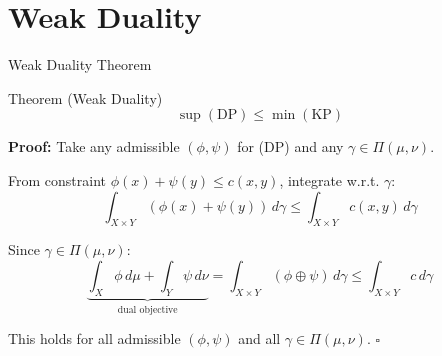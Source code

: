 \documentclass[aspectratio=169]{beamer}
\begin{document}
\section{Weak Duality}

\begin{frame}{Weak Duality Theorem}
\begin{block}{Theorem (Weak Duality)}
\vspace{-0.1cm}
\[
\boxed{\sup(\text{DP}) \leq \min(\text{KP})}
\]
\vspace{-0.2cm}
\end{block}

\textbf{Proof:} Take any admissible $(\phi, \psi)$ for (DP) and any $\gamma \in \Pi(\mu,\nu)$.

\vspace{0.1cm}
From constraint $\phi(x) + \psi(y) \leq c(x,y)$, integrate w.r.t. $\gamma$:
\[
\int_{X \times Y} (\phi(x) + \psi(y)) \, d\gamma \leq \int_{X \times Y} c(x,y) \, d\gamma
\]
\vspace{-0.1cm}

Since $\gamma \in \Pi(\mu,\nu)$:
\[
\underbrace{\int_X \phi \, d\mu + \int_Y \psi \, d\nu}_{\text{dual objective}} = \int_{X \times Y} (\phi \oplus \psi) \, d\gamma \leq \int_{X \times Y} c \, d\gamma
\]
\vspace{-0.1cm}

This holds for all admissible $(\phi,\psi)$ and all $\gamma \in \Pi(\mu,\nu)$. \hfill $\square$
\end{frame}
\end{document}

